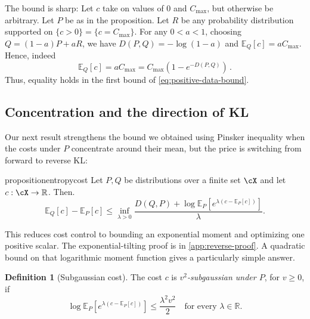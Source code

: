 \documentclass[11pt,twoside]{article}
\newcommand{\R}{\mathbb R}
\newcommand{\E}{\mathbb E}
\newcommand{\KL}{D}
\theoremstyle{definition}
\newtheorem{definition}[theorem]{Definition}
\theoremstyle{remark}
\begin{document}
The bound is sharp:
Let $c$ take on values of $0$ and $C_{\max}$, but otherwise be arbitrary.
Let $P$ be as in the proposition.
Let $R$ be any probability distribution supported on
$\{c>0\} = \{ c = C_{\max} \}$.
For any \(0<a<1\), choosing $Q = (1-a) P + a R$, we have
$\KL(P, Q)=-\log(1-a)$
and
$\E_Q[c]=aC_{\max}$.
Hence, indeed
\[
 \E_Q[c]=aC_{\max} = C_{\max} (1- e^{-\KL(P, Q)})\,.
\]
Thus, equality holds in the first bound of
\cref{eq:positive-data-bound}.

\subsection{Concentration and the direction of KL}
\label{sec:cost-concentration}
Our next result strengthens the bound we obtained
using Pinsker inequality when
the costs under $P$ concentrate around their mean,
but the price is switching from forward to reverse KL:

\begin{restatable}{proposition}{entropycost}
\label{prop:entropy-cost}
Let $P,Q$ be distributions over a finite set $\cX$ and let $c:\cX \to \R$. Then.
\begin{equation}
 \E_Q[c]-\E_P[c]
 \le\inf_{\lambda>0}
 \frac{\KL(Q, P)
       +\log\E_P[e^{\lambda(c-\E_P[c])}]}{\lambda}.
 \label{eq:entropy-cost}
\end{equation}
\end{restatable}

This reduces cost control to bounding an exponential moment and
optimizing one positive scalar. The exponential-tilting proof is in
\cref{app:reverse-proof}. A quadratic bound on that logarithmic
moment function gives a particularly simple answer.

\begin{definition}[Subgaussian cost]
The cost \(c\) is \emph{\(v^2\)-subgaussian under \(P\)}, for \(v\ge0\),
if
\begin{equation}
 \log\E_P\!\left[
 e^{\lambda(c-\E_P[c])}\right]
 \le\frac{\lambda^2v^2}{2}
 \quad\text{for every }\lambda\in\R.
 \label{eq:subgaussian}
\end{equation}
\end{definition}
\end{document}
